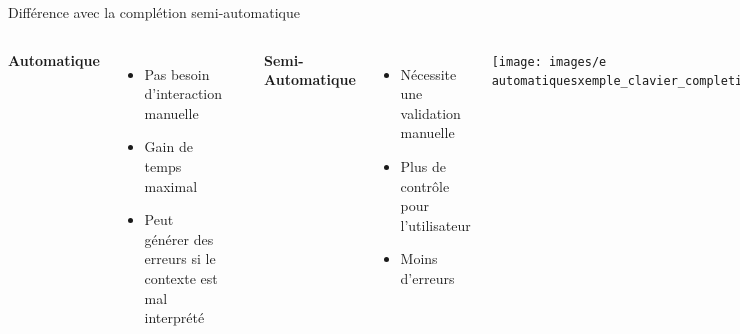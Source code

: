 \begin{frame}{Différence avec la complétion semi-automatique}
	\begin{columns}
		\textbf{Automatique}
		\begin{itemize}
			\item Pas besoin d'interaction manuelle
			\item Gain de temps maximal
			\item Peut générer des erreurs si le contexte est mal interprété
		\end{itemize}
		\includegraphics[width=0.9\textwidth]{images/exemple_clavier_completion_auto.png}
		
		\textbf{Semi-Automatique}
		\begin{itemize}
			\item Nécessite une validation manuelle
			\item Plus de contrôle pour l'utilisateur
			\item Moins d’erreurs
		\end{itemize}
		\texttt{[image: images/e automatiquesxemple\_clavier\_completion\_semi.png]}
	\end{columns}
\end{frame}


